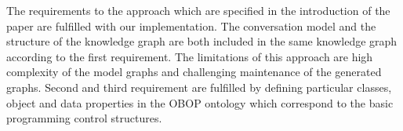 \documentclass[runningheads]{llncs}
\begin{document}
The requirements to the approach which are specified in the introduction of the paper are fulfilled with our implementation. The conversation model and the structure of the knowledge graph are both included in the same knowledge graph according to the first requirement. The limitations of this approach are high complexity of the model graphs and challenging maintenance of the generated graphs. Second and third requirement are fulfilled by defining particular classes, object and data properties in the OBOP ontology which correspond to the basic programming control structures. 

%
%
%


%
\end{document}
